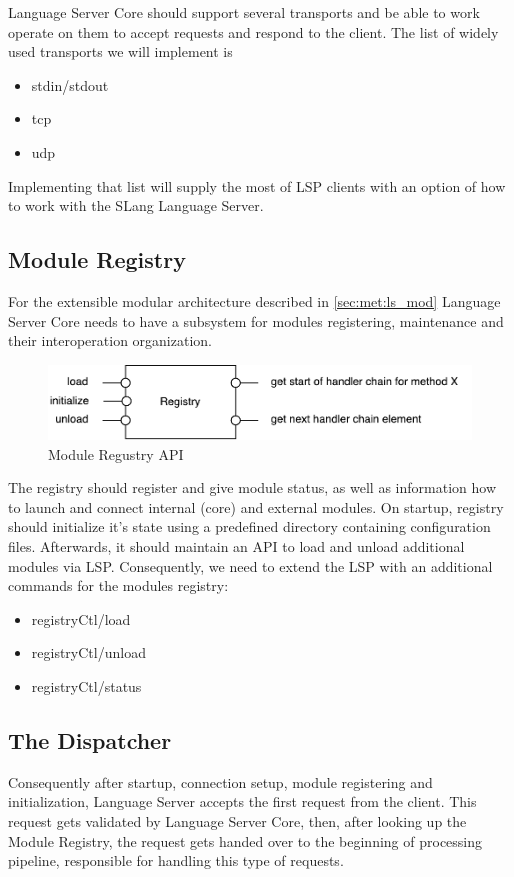 Language Server Core should support several transports and be able to work operate on them to accept requests 
and respond to the client. The list of widely used transports we will implement is
\begin{itemize}
    \item stdin/stdout
    \item tcp
    \item udp
\end{itemize}
Implementing that list will supply the most of LSP clients with an option of how to work with the SLang Language Server.  

\subsection{Module Registry}
\label{sec:met:ls_design:ModuleRegistry}
For the extensible modular architecture described in \ref{sec:met:ls_mod} Language Server Core needs to have a subsystem 
for modules registering, maintenance and their interoperation organization.

\begin{figure}[H]
    \centering
    \includegraphics[width=.7\textwidth]{figs/registry.pdf}
    \caption{Module Regustry API}
\end{figure}

The registry should register and give module status, as well as information how to launch and connect
internal (core) and external modules. On startup, registry should initialize it's state using a predefined directory
containing configuration files. Afterwards, it should maintain an API to load and unload additional modules via LSP.
Consequently, we need to extend the LSP with an additional commands for the modules registry:

\begin{itemize}
    \item registryCtl/load
    \item registryCtl/unload
    \item registryCtl/status
\end{itemize}

\subsection{The Dispatcher}
\label{sec:met:ls_design:RequestsDispatcher}
Consequently after startup, connection setup, module registering and initialization, 
Language Server accepts the first request from the client. 
This request gets validated by Language Server Core, then, after looking up the Module Registry, the request 
gets handed over to the beginning of processing pipeline, responsible for handling this type of requests.

